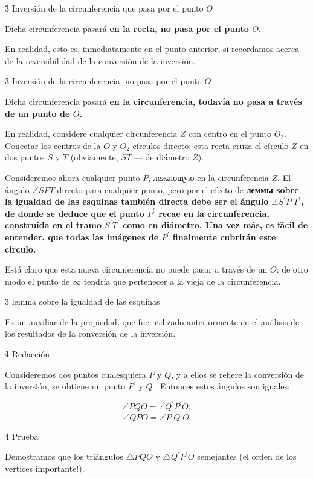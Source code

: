\h3{ Inversión de la circunferencia que pasa por el punto $O$ }

Dicha circunferencia pasará \bf{en la recta}, no pasa por el punto $O$.

En realidad, esto es, inmediatamente en el punto anterior, si recordamos acerca de la reversibilidad de la conversión de la inversión.


\h3{ Inversión de la circunferencia, no pasa por el punto $O$ }

Dicha circunferencia pasará \bf{en la circunferencia}, todavía no pasa a través de un punto de $O$.


En realidad, considere cualquier circunferencia $Z$ con centro en el punto $O_2$. Conectar los centros de la $O$ y $O_2$ círculos directo; esta recta cruza el círculo $Z$ en dos puntos $S$ y $T$ (obviamente, $ST$ --- de diámetro $Z$).

Consideremos ahora cualquier punto $P$, лежающую en la circunferencia $Z$. El ángulo $\angle SPT$ directo para cualquier punto, pero por el efecto de \bf{леммы sobre la igualdad de las esquinas} también directa debe ser el ángulo $\angle S^\prime P^\prime T^\prime$, de donde se deduce que el punto $P^\prime$ recae en la circunferencia, construida en el tramo $S^\prime T^\prime$ como en diámetro. Una vez más, es fácil de entender, que todas las imágenes de $P^\prime$ finalmente cubrirán este círculo.

Está claro que esta nueva circunferencia no puede pasar a través de un $O$: de otro modo el punto de $\infty$ tendría que pertenecer a la vieja de la circunferencia.


\h3{ lemma sobre la igualdad de las esquinas }

Es un auxiliar de la propiedad, que fue utilizado anteriormente en el análisis de los resultados de la conversión de la inversión.

\h4{ Redacción }

Consideremos dos puntos cualesquiera $P$ y $Q$, y a ellos se refiere la conversión de la inversión, se obtiene un punto $P^\prime$ y $Q^\prime$. Entonces estos ángulos son iguales:

$$ \angle PQO = \angle Q^\prime P^\prime O, $$
$$ \angle QPO = \angle P^\prime Q^\prime O. $$

\h4{ Prueba }

Demostramos que los triángulos $\triangle PQO$ y $\triangle Q^\prime P^\prime O$ semejantes (el orden de los vértices importante!).

